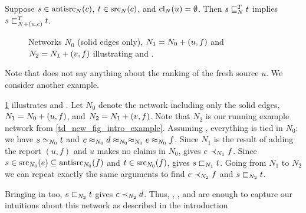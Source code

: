 
\begin{axiom}[\sourceposresp{}]
    Suppose $s \in \operatorname{antisrc}_N(c)$, $t \in \operatorname{src}_N(c)$, and $\operatorname{cl}_N(u) =
    \emptyset$. Then $s \sqsubseteq_N^T t$ implies $s \sqsubset_{{N} + ({u}, {c})}^T t$.
\end{axiom}

\begin{figure}
    \centering
    \caption{
        Networks $N_0$ (solid edges only), $N_1 = {N_0} + ({u}, {f})$ and
        $N_2 = {N_1} + ({v}, {f})$ illustrating \freshposresp{} and
        \sourceposresp{}.
    }
    \label{td_new_fig_sourceposresp_example}
\end{figure}

Note that \sourceposresp{} does not say anything about the ranking of the fresh
source $u$. We consider another example.

\begin{example}
    \label{td_new_ex_posresps}
    \cref{td_new_fig_sourceposresp_example} illustrates \freshposresp{} and
    \sourceposresp{}. Let $N_0$ denote the network including only the solid
    edges, $N_1 = {N_0} + ({u}, {f})$, and $N_2 = {N_1} + ({v}, {f})$. Note
    that $N_2$ is our running example network from
    \cref{td_new_fig_intro_example}.
    Assuming \symmetry{}, everything is tied in $N_0$: we have $s \simeq_{N_0} t$
    and $c \approx_{N_0} d \approx_{N_0} \approx_{N_0} e \approx_{N_0} f$. Since $N_1$ is
    the result of adding the report $(u, f)$ and $u$ makes no claims in $N_0$,
    \freshposresp{} gives $e \prec_{N_1} f$. Since $s \in \operatorname{src}_{N_0}(e)
    \subseteq \operatorname{antisrc}_{N_0}(f)$ and $t \in \operatorname{src}_{N_0}(f)$, \sourceposresp{}
    gives $s \sqsubset_{N_1} t$. Going from $N_1$ to $N_2$ we can repeat exactly the
    same arguments to find $e \prec_{N_2} f$ and $s \sqsubset_{N_2} t$.

    Bringing \claimcoherence{} in too, $s \sqsubset_{N_2} t$ gives $c \prec_{N_2} d$.
    Thus, \claimcoherence{}, \symmetry{}, \freshposresp{} and \sourceposresp{}
    are enough to capture our intuitions about this network as described in the
    introduction 
\end{example}

